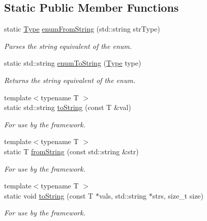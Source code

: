 \subsection*{Static Public Member Functions}
\begin{DoxyCompactItemize}
\item 
static \hyperlink{classBUSBOY_1_1Primitive_afa08dc3cc68d2e851adafb0fc492cf15}{Type} \hyperlink{classBUSBOY_1_1Primitive_a38158d1a2452165a27c6cb2279cb0624}{enumFromString} (std::string strType)
\begin{DoxyCompactList}\small\item\em Parses the string equivalent of the enum. \item\end{DoxyCompactList}\item 
static std::string \hyperlink{classBUSBOY_1_1Primitive_ababc327b08e5eb9305fe48e6735b4780}{enumToString} (\hyperlink{classBUSBOY_1_1Primitive_afa08dc3cc68d2e851adafb0fc492cf15}{Type} type)
\begin{DoxyCompactList}\small\item\em Returns the string equivalent of the enum. \item\end{DoxyCompactList}\item 
{\footnotesize template$<$typename T $>$ }\\static std::string \hyperlink{classBUSBOY_1_1Primitive_a55244fa8d9488ae8d9b1d1bd1eedbcf7}{toString} (const T \&val)
\begin{DoxyCompactList}\small\item\em For use by the framework. \item\end{DoxyCompactList}\item 
{\footnotesize template$<$typename T $>$ }\\static T \hyperlink{classBUSBOY_1_1Primitive_aaed30daa2799a2e918343211915a77f5}{fromString} (const std::string \&str)
\begin{DoxyCompactList}\small\item\em For use by the framework. \item\end{DoxyCompactList}\item 
{\footnotesize template$<$typename T $>$ }\\static void \hyperlink{classBUSBOY_1_1Primitive_aafde6fe3de51895d6b82b527cb2202e5}{toString} (const T $\ast$vals, std::string $\ast$strs, size\_\-t size)
\begin{DoxyCompactList}\small\item\em For use by the framework. \item\end{DoxyCompactList}\item 

\end{DoxyCompactItemize}
